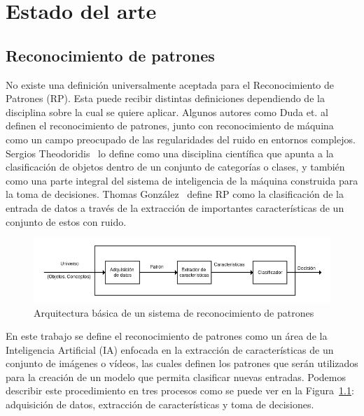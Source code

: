 \chapter[Estado del arte]{Estado del arte}
\label{ch:estado_del_arte}

\section{Reconocimiento de patrones}
\label{sec:rec_patrones}
	No existe una definición universalmente aceptada para el Reconocimiento de Patrones (RP). Esta puede recibir distintas definiciones dependiendo de la disciplina sobre la cual se quiere aplicar. Algunos autores como Duda et. al~\cite{Duda1973} definen el reconocimiento de patrones, junto con reconocimiento de máquina como un campo preocupado de las regularidades del ruido en entornos complejos. Sergios Theodoridis~\cite{Theodoridis2008} lo define como una disciplina científica que apunta a la clasificación de objetos dentro de un conjunto de categorías o clases, y también como una parte integral del sistema de inteligencia de la máquina construida para la toma de decisiones. Thomas González~\cite{Gonzalez1978} define RP como la clasificación de la entrada de datos a través de la extracción de importantes características de un conjunto de estos con ruido. 

\begin{figure}[b]
  \centering
   \includegraphics[width=1\textwidth]{Figuras/Diagramas/estado_del_arte/Reconocimiento_de_patrones.png}
  \caption{Arquitectura básica de un sistema de reconocimiento de patrones}
  \label{art:fig:arquitectura}
\end{figure}


En este trabajo se define el reconocimiento de patrones como un área de la Inteligencia Artificial (IA) enfocada en la extracción de características de un conjunto de imágenes o vídeos, las cuales definen los patrones que serán utilizados para la creación de un modelo que permita clasificar nuevas entradas. Podemos describir este procedimiento en tres procesos como se puede ver en la Figura~\ref{art:fig:arquitectura}: adquisición de datos, extracción de características y toma de decisiones. 

